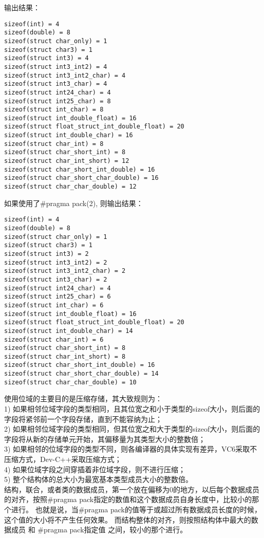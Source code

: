 输出结果：
\begin{verbatim}
sizeof(int) = 4
sizeof(double) = 8
sizeof(struct char_only) = 1
sizeof(struct char3) = 1
sizeof(struct int3) = 4
sizeof(struct int3_int2) = 4
sizeof(struct int3_int2_char) = 4
sizeof(struct int3_char) = 4
sizeof(struct int24_char) = 4
sizeof(struct int25_char) = 8
sizeof(struct int_char) = 8
sizeof(struct int_double_float) = 16
sizeof(struct float_struct_int_double_float) = 20
sizeof(struct int_double_char) = 16
sizeof(struct char_int) = 8
sizeof(struct char_short_int) = 8
sizeof(struct char_int_short) = 12
sizeof(struct char_short_int_double) = 16
sizeof(struct char_short_char_double) = 16
sizeof(struct char_char_double) = 12
\end{verbatim}
如果使用了\#pragma pack(2), 则输出结果：
\begin{verbatim}
sizeof(int) = 4
sizeof(double) = 8
sizeof(struct char_only) = 1
sizeof(struct char3) = 1
sizeof(struct int3) = 2
sizeof(struct int3_int2) = 2
sizeof(struct int3_int2_char) = 2
sizeof(struct int3_char) = 2
sizeof(struct int24_char) = 4
sizeof(struct int25_char) = 6
sizeof(struct int_char) = 6
sizeof(struct int_double_float) = 16
sizeof(struct float_struct_int_double_float) = 20
sizeof(struct int_double_char) = 14
sizeof(struct char_int) = 6
sizeof(struct char_short_int) = 8
sizeof(struct char_int_short) = 8
sizeof(struct char_short_int_double) = 16
sizeof(struct char_short_char_double) = 14
sizeof(struct char_char_double) = 10

\end{verbatim}


使用位域的主要目的是压缩存储，其大致规则为：  \\
 1) 如果相邻位域字段的类型相同，且其位宽之和小于类型的sizeof大小，则后面的字段将紧邻前一个字段存储，直到不能容纳为止；  \\
 2) 如果相邻位域字段的类型相同，但其位宽之和大于类型的sizeof大小，则后面的字段将从新的存储单元开始，其偏移量为其类型大小的整数倍；  \\
 3) 如果相邻的位域字段的类型不同，则各编译器的具体实现有差异，VC6采取不压缩方式，Dev-C++采取压缩方式；  \\
 4) 如果位域字段之间穿插着非位域字段，则不进行压缩；  \\
 5) 整个结构体的总大小为最宽基本类型成员大小的整数倍。\\

结构，联合，或者类的数据成员，第一个放在偏移为0的地方，以后每个数据成员的对齐，按照\#pragma pack指定的数值和这个数据成员自身长度中，比较小的那个进行。
 也就是说，当\#pragma pack的值等于或超过所有数据成员长度的时候，这个值的大小将不产生任何效果。
 而结构整体的对齐，则按照结构体中最大的数据成员 和 \#pragma pack指定值 之间，较小的那个进行。

